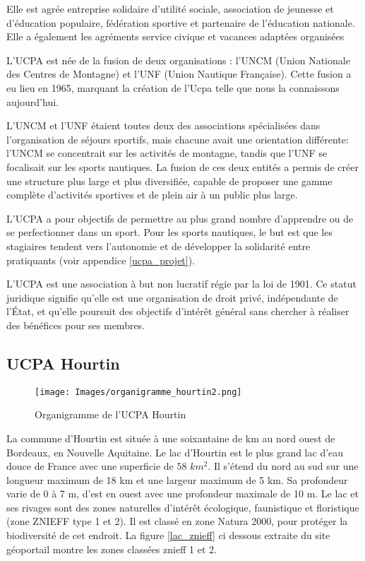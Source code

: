 \documentclass[11pt,a4paper]{report}
\begin{document}
Elle est agrée entreprise solidaire d’utilité sociale, association de
jeunesse et d’éducation populaire, fédération sportive et partenaire de 
l’éducation nationale. Elle a également les agréments service civique et
vacances adaptées organisées

L'UCPA est  née de la fusion de deux organisations : l'UNCM 
(Union Nationale des Centres de Montagne) et l'UNF 
(Union Nautique Française). Cette fusion a eu lieu en 1965, 
marquant la création de l'Ucpa telle que nous la connaissons
aujourd'hui.

L'UNCM et l'UNF étaient toutes deux des associations spécialisées
dans l'organisation de séjours sportifs, mais chacune avait une
orientation différente: l'UNCM se concentrait sur les activités 
de montagne, tandis que l'UNF se focalisait sur les sports nautiques. 
La fusion de ces deux entités a permis de créer une structure plus 
large et plus diversifiée, capable de proposer une gamme complète 
d'activités sportives et de plein air à un public plus large.

L'UCPA a pour objectifs de permettre au plus grand nombre
d'apprendre ou de se perfectionner dans un sport.
Pour les sports nautiques, le but est que les stagiaires
tendent vers l'autonomie  et de développer la solidarité entre
pratiquants (voir appendice \ref{ucpa_projet}).


L'UCPA est 
une association à but non lucratif régie par la loi de 1901. 
Ce statut juridique signifie qu'elle est une organisation de
droit privé, indépendante de l'État, et qu'elle poursuit des
objectifs d'intérêt général sans chercher à  réaliser des
bénéfices pour ses membres.

\subsection{UCPA Hourtin}
\begin{figure}[h]
\centering
\texttt{[image: Images/organigramme\_hourtin2.png]} 
\caption{Organigramme de l'UCPA Hourtin\label{organi_hourtin}}
\end{figure}
La commune d'Hourtin est située à une soixantaine de km au nord ouest 
de Bordeaux, en Nouvelle Aquitaine. Le lac d'Hourtin est le plus grand
lac d'eau douce de France avec une superficie de $58 \,\,km^2$.
Il s'étend du nord au sud sur une longueur maximum de 18 km 
et une largeur maximum de 5 km. Sa profondeur varie de 0 à 7 m, 
d'est en ouest avec une profondeur maximale de 10 m.
Le lac et ses rivages sont des zones naturelles  d'intér\^et écologique, 
faunistique et floristique (zone ZNIEFF type 1 et 2). Il est classé
en zone  Natura 2000\cite{natura2000}, pour protéger la biodiversité
de cet endroit. La figure \ref{lac_znieff} ci dessous extraite
du site géoportail montre les zones classées znieff 1 et 2.
\end{document}

